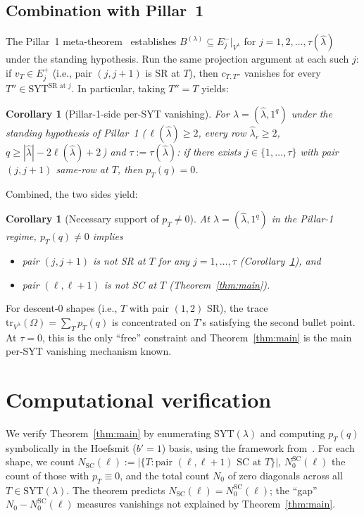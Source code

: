 \documentclass[11pt]{article}
\newtheorem{corollary}[theorem]{Corollary}
\theoremstyle{definition}
\newcommand{\Vlam}{V^\lambda}
\newcommand{\Om}{\Omega}
\newcommand{\hatl}{\widehat\lambda}
\newcommand{\SYT}{\mathrm{SYT}}
\newcommand{\elh}{\ell(\hatl)}
\newcommand{\Eplus}{E^+}
\newcommand{\Eminus}{E^-}
\newcommand{\pT}{p_T}
\newcommand{\tr}{\mathrm{tr}}
\begin{document}
\subsection{Combination with Pillar~1}

The Pillar~1 meta-theorem~\cite{pillar1} establishes
$B^{(\lambda)} \subseteq \Eminus_j|_{\Vlam}$ for $j = 1, 2, \ldots, \tau(\hatl)$
under the standing hypothesis. Run the same projection argument at each
such $j$: if $v_T \in \Eplus_j$ (i.e., pair $(j, j+1)$ is SR at $T$),
then $c_{T, T''}$ vanishes for every $T'' \in \SYT^{\mathrm{SR}\text{ at }j}$.
In particular, taking $T'' = T$ yields:

\begin{corollary}[Pillar-1-side per-SYT vanishing]\label{cor:pillar1-side}
For $\lambda = (\hatl, 1^q)$ under the standing hypothesis of Pillar~1
(\,$\elh \ge 2$, every row $\hatl_r \ge 2$, $q \ge |\hatl| - 2\elh + 2$\,)
and $\tau := \tau(\hatl)$: if there exists $j \in \{1, \ldots, \tau\}$ with
pair $(j, j+1)$ same-row at $T$, then $\pT(q) = 0$.
\end{corollary}

Combined, the two sides yield:

\begin{corollary}[Necessary support of $\pT \ne 0$]\label{cor:nec-support}
At $\lambda = (\hatl, 1^q)$ in the Pillar-1 regime,
$\pT(q) \ne 0$ implies
\begin{itemize}[topsep=0.2em,itemsep=0.1em]
\item pair $(j, j+1)$ is \emph{not} SR at $T$ for any $j = 1, \ldots, \tau$
   (Corollary~\ref{cor:pillar1-side}), and
\item pair $(\ell, \ell+1)$ is \emph{not} SC at $T$
   (Theorem~\ref{thm:main}).
\end{itemize}
\end{corollary}

For descent-$0$ shapes (i.e., $T$ with pair $(1,2)$ SR), the trace
$\tr_{\Vlam}(\Om) = \sum_T \pT(q)$ is concentrated on $T$'s satisfying
the second bullet point. At $\tau = 0$, this is the only ``free''
constraint and Theorem~\ref{thm:main} is the main per-SYT vanishing
mechanism known.

\section{Computational verification}\label{sec:verify}

We verify Theorem~\ref{thm:main} by enumerating $\SYT(\lambda)$ and
computing $\pT(q)$ symbolically in the Hoefsmit ($b'\!=\!1$) basis, using
the framework from~\cite{converse}. For each shape, we count
$N_{\mathrm{SC}}(\ell) := |\{T : \text{pair }(\ell,\ell+1) \text{ SC at } T\}|$,
$N_0^{\mathrm{SC}}(\ell)$ the count of those with $\pT \equiv 0$, and the
total count $N_0$ of zero diagonals across all $T \in \SYT(\lambda)$. The
theorem predicts $N_{\mathrm{SC}}(\ell) = N_0^{\mathrm{SC}}(\ell)$; the
``gap'' $N_0 - N_0^{\mathrm{SC}}(\ell)$ measures vanishings not explained
by Theorem~\ref{thm:main}.
\end{document}
